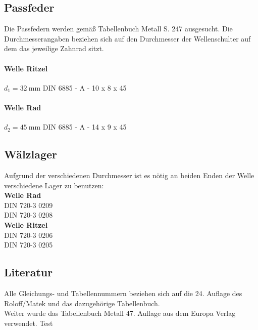 \documentclass[15pt,a4paper]{article}
\begin{document}
	 	\subsection{Passfeder}
	 		Die Passfedern werden gemäß Tabellenbuch Metall S. 247 ausgesucht. Die Durchmesserangaben beziehen sich auf den Durchmesser der Wellenschulter auf dem das jeweilige Zahnrad sitzt.
	 		\paragraph{Welle Ritzel}
	 			$d_1 = \SI{32}{\milli\m}$
	 			DIN 6885 - A - 10 x 8 x 45
	 		\paragraph{Welle Rad}
		 		$d_2 = \SI{45}{\milli\m}$
		 		DIN 6885 - A - 14 x 9 x 45
		 \subsection{Wälzlager}		
		 	Aufgrund der verschiedenen Durchmesser ist es nötig an beiden Enden der Welle verschiedene Lager zu benutzen:\\
		 		\textbf{Welle Rad}\\
		 			DIN 720-3 0209\\
		 			DIN 720-3 0208\\
		 		\textbf{Welle Ritzel}\\
		 			DIN 720-3 0206\\
		 			DIN 720-3 0205
 		\subsection{Literatur}	
 			Alle Gleichungs- und Tabellennummern beziehen sich auf die 24. Auflage des Roloff/Matek und das dazugehörige Tabellenbuch.\\
 			Weiter wurde das Tabellenbuch Metall 47. Auflage aus dem Europa Verlag verwendet. Test
 			
\end{document}
